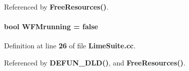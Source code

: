 Referenced by {\bf Free\+Resources()}.

\paragraph[{W\+F\+Mrunning}]{\setlength{\rightskip}{0pt plus 5cm}bool W\+F\+Mrunning = false}\label{LimeSuite_8cc_a91ea74fc7686fbc5a5ad25bc5c487343}


Definition at line {\bf 26} of file {\bf Lime\+Suite.\+cc}.



Referenced by {\bf D\+E\+F\+U\+N\+\_\+\+D\+L\+D()}, and {\bf Free\+Resources()}.

